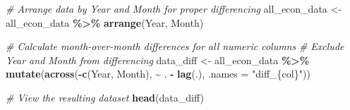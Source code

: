 \documentclass[
]{article}
\newenvironment{Shaded}{\begin{snugshade}}{\end{snugshade}}
\newcommand{\AttributeTok}[1]{\textcolor[rgb]{0.13,0.29,0.53}{#1}}
\newcommand{\CommentTok}[1]{\textcolor[rgb]{0.56,0.35,0.01}{\textit{#1}}}
\newcommand{\FunctionTok}[1]{\textcolor[rgb]{0.13,0.29,0.53}{\textbf{#1}}}
\newcommand{\NormalTok}[1]{#1}
\newcommand{\OtherTok}[1]{\textcolor[rgb]{0.56,0.35,0.01}{#1}}
\newcommand{\SpecialCharTok}[1]{\textcolor[rgb]{0.81,0.36,0.00}{\textbf{#1}}}
\newcommand{\StringTok}[1]{\textcolor[rgb]{0.31,0.60,0.02}{#1}}
\begin{document}
\begin{Shaded}
\begin{Highlighting}[]
\CommentTok{\# Arrange data by Year and Month for proper differencing}
\NormalTok{all\_econ\_data }\OtherTok{\textless{}{-}}\NormalTok{ all\_econ\_data }\SpecialCharTok{\%\textgreater{}\%}
  \FunctionTok{arrange}\NormalTok{(Year, Month)}

\CommentTok{\# Calculate month{-}over{-}month differences for all numeric columns}
\CommentTok{\# Exclude \textquotesingle{}Year\textquotesingle{} and \textquotesingle{}Month\textquotesingle{} from differencing}
\NormalTok{data\_diff }\OtherTok{\textless{}{-}}\NormalTok{ all\_econ\_data }\SpecialCharTok{\%\textgreater{}\%}
  \FunctionTok{mutate}\NormalTok{(}\FunctionTok{across}\NormalTok{(}\SpecialCharTok{{-}}\FunctionTok{c}\NormalTok{(Year, Month), }\SpecialCharTok{\textasciitilde{}}\NormalTok{ . }\SpecialCharTok{{-}} \FunctionTok{lag}\NormalTok{(.), }\AttributeTok{.names =} \StringTok{"diff\_\{col\}"}\NormalTok{))}

\CommentTok{\# View the resulting dataset}
\FunctionTok{head}\NormalTok{(data\_diff)}
\end{Highlighting}
\end{Shaded}
\end{document}
